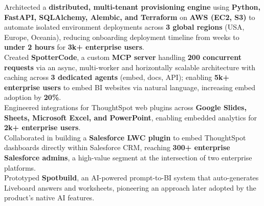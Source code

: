 \documentclass[]{Nikhil_Kadiyan_Resume}
\begin{document}
\pt Architected a \textbf{distributed, multi-tenant provisioning engine} using \textbf{Python, FastAPI, SQLAlchemy, Alembic, and Terraform} on \textbf{AWS (EC2, S3)} to automate isolated environment deployments across \textbf{3 global regions} (USA, Europe, Oceania), reducing onboarding deployment timeline from weeks to \textbf{under 2 hours} for \textbf{3k+ enterprise users}.\\
\pt Created \textbf{SpotterCode}, a custom \textbf{MCP server} handling \textbf{200 concurrent requests} via an async, multi-worker and horizontally scalable architecture with caching across \textbf{3 dedicated agents} (embed, docs, API); enabling \textbf{5k+ enterprise users} to embed BI websites via natural language, increasing embed adoption by \textbf{20\%}.\\
\pt Engineered integrations for ThoughtSpot web plugins across \textbf{Google Slides, Sheets, Microsoft Excel, and PowerPoint}, enabling embedded analytics for \textbf{2k+ enterprise users}.\\
\pt Collaborated in building a \textbf{Salesforce LWC plugin} to embed ThoughtSpot dashboards directly within Salesforce CRM, reaching \textbf{300+ enterprise Salesforce admins}, a high-value segment at the intersection of two enterprise platforms.\\
\pt Prototyped \textbf{Spotbuild}, an AI-powered prompt-to-BI system that auto-generates Liveboard answers and worksheets, pioneering an approach later adopted by the product's native AI features.\\
\sectionsep
\end{document}
